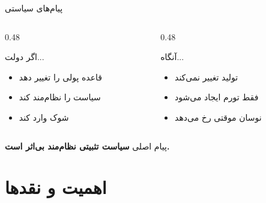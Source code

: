 \documentclass[aspectratio=169,11pt]{beamer}
\newcommand{\important}[1]{\textcolor{AlertRed}{\textbf{#1}}}
\begin{document}
\begin{frame}{پیام‌های سیاستی}
  \begin{LTR}
  \begin{columns}[T]
    \begin{column}{0.48\textwidth}
      \begin{RTL}
      \begin{alertblock}{اگر دولت...}
        \begin{itemize}
          \item قاعده پولی را تغییر دهد
          \item سیاست را نظام‌مند کند
          \item شوک وارد کند
        \end{itemize}
      \end{alertblock}
      \end{RTL}
    \end{column}
    \hfill
    \begin{column}{0.48\textwidth}
      \begin{RTL}
      \begin{exampleblock}{آنگاه...}
        \begin{itemize}
          \item تولید تغییر نمی‌کند
          \item فقط تورم ایجاد می‌شود
          \item نوسان موقتی رخ می‌دهد
        \end{itemize}
      \end{exampleblock}
      \end{RTL}
    \end{column}
  \end{columns}
  \end{LTR}
  \vspace{0.4cm}
  \begin{block}{پیام اصلی}
    \centering
    \large
    \important{سیاست تثبیتی نظام‌مند بی‌اثر است.}
  \end{block}
\end{frame}

\section{اهمیت و نقدها}
\end{document}
